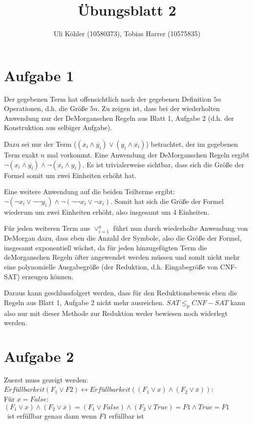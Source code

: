 \documentclass[a4paper,10pt,oneside,leqno]{scrartcl}
\title{Übungsblatt 2}
\author{Uli Köhler (10580373), Tobias Harrer (10575835)}
\begin{document}
\maketitle
\section*{Aufgabe 1}%

Der gegebenen Term hat offensichtlich nach der gegebenen Definition $5n$ Operationen, d.h. die Größe $5n$. Zu zeigen ist, dass bei der wiederholten Anwendung nur der DeMorganschen Regeln aus Blatt 1, Aufgabe 2 (d.h. der Konstruktion aus selbiger Aufgabe).

Dazu sei nur der Term ($(x_i \wedge \overline{y_i}) \vee (y_i \wedge \overline{x_i})$) betrachtet, der im gegebenen Term exakt $n$ mal vorkommt.
Eine Anwendung der DeMorganschen Regeln ergibt $\neg(x_i \wedge \overline{y_i}) \wedge \neg(\overline{x_i} \wedge y_i)$. Es ist trivialerweise sichtbar, dass sich die Größe der Formel somit um zwei Einheiten erhöht hat.

Eine weitere Anwendung auf die beiden Teilterme ergibt:\\
$\neg(\neg x_i \vee \neg\neg y_i) \wedge \neg(\neg \neg x_i \vee \neg x_i)$. Somit hat sich die Größe der Formel wiederum um zwei Einheiten erhöht, also insgesamt um 4 Einheiten.

Für jeden weiteren Term aus $\vee_{i=1}^{n}$ führt nun durch wiederholte Anwendung von DeMorgan dazu, dass eben die Anzahl der Symbole, also die Größe der Formel, insgesamt exponentiell wächst, da für jeden hinzugefügten Term die deMorganschen Regeln öfter angewendet werden müssen und somit nicht mehr eine polynomielle Ausgabegröße (der Reduktion, d.h. Eingabegröße von CNF-SAT) erzeugen können.

Daraus kann geschlussfolgert werden, dass für den Reduktionsbeweis eben die Regeln aus Blatt 1, Aufgabe 2 nicht mehr ausreichen. $SAT \leq_p CNF-SAT$ kann also nur mit dieser Methode zur Reduktion weder bewiesen noch widerlegt werden.

\section*{Aufgabe 2}%
Zuerst muss gezeigt werden: $Erfüllbarkeit(F_1\vee F2) \leftrightarrow Erfüllbarkeit((F_1\vee x) \wedge (F_2 \vee \overline{x}))$:\\
Für $x = False$: $(F_1\vee x) \wedge (F_2 \vee \overline{x}) = (F_1\vee False) \wedge (F_2 \vee True) = F1 \wedge True = F1$\\
\textrightarrow\ ist erfüllbar genau dann wenn $F1$ erfüllbar ist
\end{document}
